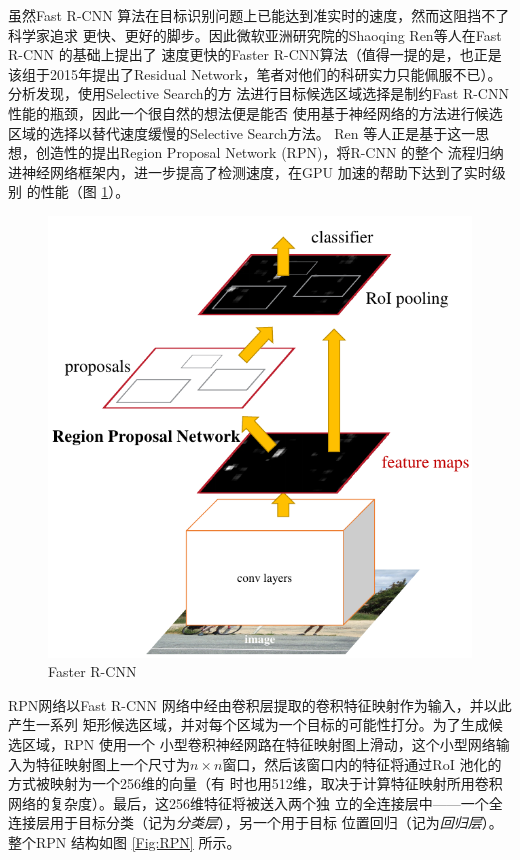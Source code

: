 虽然Fast R-CNN 算法在目标识别问题上已能达到准实时的速度，然而这阻挡不了科学家追求
更快、更好的脚步。因此微软亚洲研究院的Shaoqing Ren等人在Fast R-CNN 的基础上提出了
速度更快的Faster R-CNN算法\cite{Ren:2015ug}（值得一提的是，也正是该组于2015年提出了Residual
Network，笔者对他们的科研实力只能佩服不已）。分析发现，使用Selective Search的方
法进行目标候选区域选择是制约Fast R-CNN 性能的瓶颈，因此一个很自然的想法便是能否
使用基于神经网络的方法进行候选区域的选择以替代速度缓慢的Selective Search方法。
Ren 等人正是基于这一思想，创造性的提出Region Proposal Network (RPN)，将R-CNN 的整个
流程归纳进神经网络框架内，进一步提高了检测速度，在GPU 加速的帮助下达到了实时级别
的性能（图 \ref{Fig:FasterRCNN}）。

\begin{figure}[ht]
  \centering
  \includegraphics[width=0.8\linewidth]{./Figure/FasterRCNN.png}
  \caption{Faster R-CNN\cite{Ren:2015ug}}\label{Fig:FasterRCNN}
\end{figure}

RPN网络以Fast R-CNN 网络中经由卷积层提取的卷积特征映射作为输入，并以此产生一系列
矩形候选区域，并对每个区域为一个目标的可能性打分。为了生成候选区域，RPN 使用一个
小型卷积神经网路在特征映射图上滑动，这个小型网络输入为特征映射图上一个尺寸为$n
\times n$窗口，然后该窗口内的特征将通过RoI 池化的方式被映射为一个256维的向量（有
时也用512维，取决于计算特征映射所用卷积网络的复杂度）。最后，这256维特征将被送入两个独
立的全连接层中——一个全连接层用于目标分类（记为\textit{分类层}），另一个用于目标
位置回归（记为\textit{回归层}）。整个RPN 结构如图 \ref{Fig:RPN} 所示。

